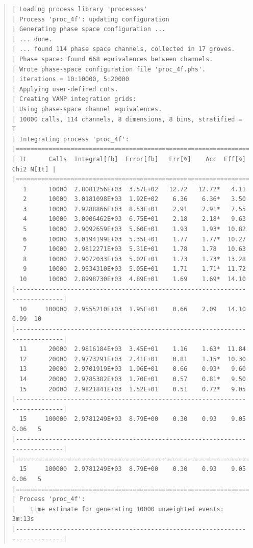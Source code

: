 \documentclass[12pt]{book}
\begin{document}
\begin{quote}
\begin{footnotesize}
\begin{verbatim}
| Loading process library 'processes'
| Process 'proc_4f': updating configuration
| Generating phase space configuration ...
| ... done.
| ... found 114 phase space channels, collected in 17 groves.
| Phase space: found 668 equivalences between channels.
| Wrote phase-space configuration file 'proc_4f.phs'.
| iterations = 10:10000, 5:20000
| Applying user-defined cuts.
| Creating VAMP integration grids:
| Using phase-space channel equivalences.
| 10000 calls, 114 channels, 8 dimensions, 8 bins, stratified = T
| Integrating process 'proc_4f':
|=============================================================================|
| It      Calls  Integral[fb]  Error[fb]   Err[%]    Acc  Eff[%]   Chi2 N[It] |
|=============================================================================|
   1      10000  2.8081256E+03  3.57E+02   12.72   12.72*   4.11
   2      10000  3.0181098E+03  1.92E+02    6.36    6.36*   3.50
   3      10000  2.9288866E+03  8.53E+01    2.91    2.91*   7.55
   4      10000  3.0906462E+03  6.75E+01    2.18    2.18*   9.63
   5      10000  2.9092659E+03  5.60E+01    1.93    1.93*  10.82
   6      10000  3.0194199E+03  5.35E+01    1.77    1.77*  10.27
   7      10000  2.9812271E+03  5.31E+01    1.78    1.78   10.63
   8      10000  2.9072033E+03  5.02E+01    1.73    1.73*  13.28
   9      10000  2.9534310E+03  5.05E+01    1.71    1.71*  11.72
  10      10000  2.8998730E+03  4.89E+01    1.69    1.69*  14.10
|-----------------------------------------------------------------------------|
  10     100000  2.9555210E+03  1.95E+01    0.66    2.09   14.10    0.99  10
|-----------------------------------------------------------------------------|
  11      20000  2.9816184E+03  3.45E+01    1.16    1.63*  11.84
  12      20000  2.9773291E+03  2.41E+01    0.81    1.15*  10.30
  13      20000  2.9701919E+03  1.96E+01    0.66    0.93*   9.60
  14      20000  2.9785382E+03  1.70E+01    0.57    0.81*   9.50
  15      20000  2.9821841E+03  1.52E+01    0.51    0.72*   9.05
|-----------------------------------------------------------------------------|
  15     100000  2.9781249E+03  8.79E+00    0.30    0.93    9.05    0.06   5
|-----------------------------------------------------------------------------|
|=============================================================================|
  15     100000  2.9781249E+03  8.79E+00    0.30    0.93    9.05    0.06   5
|=============================================================================|
| Process 'proc_4f':
|    time estimate for generating 10000 unweighted events: 3m:13s
|-----------------------------------------------------------------------------|
\end{verbatim}
\end{footnotesize}
\end{quote}
\end{document}
